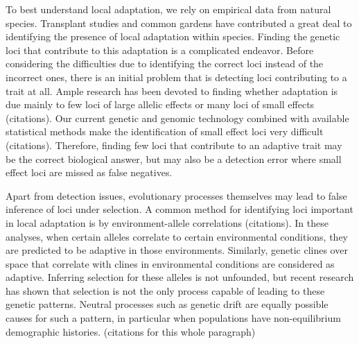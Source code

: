 To best understand local adaptation, we rely on empirical data from natural species. Transplant studies and common gardens have contributed a great deal to identifying the presence of local adaptation within species. Finding the genetic loci that contribute to this adaptation is a complicated endeavor. Before considering the difficulties due to identifying the correct loci instead of the incorrect ones, there is an initial problem that is detecting loci contributing to a trait at all. Ample research has been devoted to finding whether adaptation is due mainly to few loci of large allelic effects or many loci of small effects (\color{red}citations\color{black}). Our current genetic and genomic technology combined with available statistical methods make the identification of small effect loci very difficult (\color{red}citations\color{black}). Therefore, finding few loci that contribute to an adaptive trait may be the correct biological answer, but may also be a detection error where small effect loci are missed as false negatives.

Apart from detection issues, evolutionary processes themselves may lead to false inference of loci under selection. A common method for identifying loci important in local adaptation is by environment-allele correlations (\color{red}citations\color{black}). In these analyses, when certain alleles correlate to certain environmental conditions, they are predicted to be adaptive in those environments. Similarly, genetic clines over space that correlate with clines in environmental conditions are considered as adaptive. Inferring selection for these alleles is not unfounded, but recent research has shown that selection is not the only process capable of leading to these genetic patterns. Neutral processes such as genetic drift are equally possible causes for such a pattern, in particular when populations have non-equilibrium demographic histories. (\color{red}citations for this whole paragraph\color{black})


